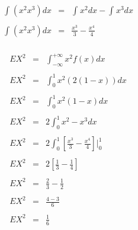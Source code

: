 \documentclass[12pt]{article}
\begin{document}
\begin{center}
\begin{equation*}
\begin{array}{c|c}
\begin{array}{l}
\begin{array}{rcl}
                        \displaystyle\int_{}^{}\left(x^2x^3\right)dx & = & \displaystyle\int_{}^{}x^2dx-\int_{}^{}x^3dx
                        \\
                        \\
                        \displaystyle\int_{}^{}\left(x^2x^3\right)dx & = & 
                        \frac{x^3}{3}-\frac{x^4}{4}
                    \end{array}
                \end{array}
            \end{array}
        \end{equation*}
    \end{center}

    \begin{center}
        \begin{equation*}
            \begin{array}{rcl}
                EX^2 & = & \displaystyle\int_{-\infty}^{+\infty}x^2 f(x) dx
                \\
                \\
                EX^2 & = &  \displaystyle\int_{0}^{1}x^2 (2\left(1-x\right)) dx
                \\
                \\
                EX^2 & = & \displaystyle\int_{0}^{1}x^2 \left(1-x\right) dx
                \\
                \\
                EX^2 & = & \displaystyle 2\int_{0}^{1}x^2 -x^3 dx
                \\
                \\
                EX^2 & = & \displaystyle 2 \int_{0}^{1}\left[\frac{x^3}{3}- \frac{x^4}{4}\right]\vert_{0}^{1}
                \\
                \\
                EX^2 & = & \displaystyle 2\left[\frac{1}{3}-\frac{1}{4}\right] 
                \\
                \\
                EX^2 & = & \displaystyle \frac{2}{3} - \frac{1}{2}
                \\
                \\
                EX^2 & = & \displaystyle \frac{4-3}{6} 
                \\
                \\
                EX^2 & = & \displaystyle \frac{1}{6} 
            \end{array}
        \end{equation*}
    \end{center}
\end{document}
